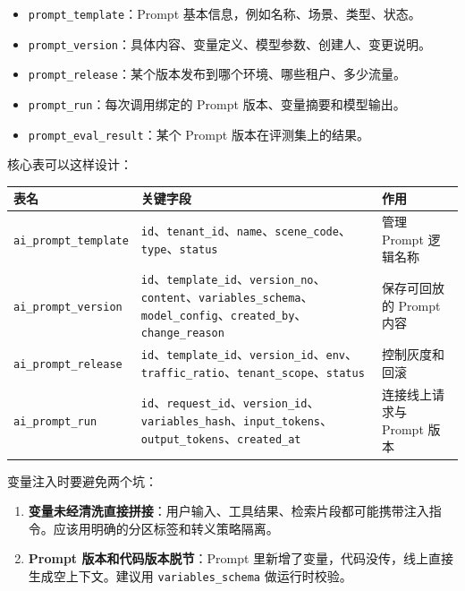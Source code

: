 \documentclass[9pt,a4paper,twocolumn]{ctexart}
\begin{document}
\begin{itemize}[itemsep=1pt, topsep=2pt]
  \item \texttt{prompt\_template}：Prompt 基本信息，例如名称、场景、类型、状态。
  \item \texttt{prompt\_version}：具体内容、变量定义、模型参数、创建人、变更说明。
  \item \texttt{prompt\_release}：某个版本发布到哪个环境、哪些租户、多少流量。
  \item \texttt{prompt\_run}：每次调用绑定的 Prompt 版本、变量摘要和模型输出。
  \item \texttt{prompt\_eval\_result}：某个 Prompt 版本在评测集上的结果。
\end{itemize}


核心表可以这样设计：


{\footnotesize
\begin{tabular}{|p{}|p{}|p{}|}
\hline
\textbf{表名} & \textbf{关键字段} & \textbf{作用} \\
\hline
\texttt{ai\_prompt\_template} & \texttt{id}、\texttt{tenant\_id}、\texttt{name}、\texttt{scene\_code}、\texttt{type}、\texttt{status} & 管理 Prompt 逻辑名称 \\
\hline
\texttt{ai\_prompt\_version} & \texttt{id}、\texttt{template\_id}、\texttt{version\_no}、\texttt{content}、\texttt{variables\_schema}、\texttt{model\_config}、\texttt{created\_by}、\texttt{change\_reason} & 保存可回放的 Prompt 内容 \\
\hline
\texttt{ai\_prompt\_release} & \texttt{id}、\texttt{template\_id}、\texttt{version\_id}、\texttt{env}、\texttt{traffic\_ratio}、\texttt{tenant\_scope}、\texttt{status} & 控制灰度和回滚 \\
\hline
\texttt{ai\_prompt\_run} & \texttt{id}、\texttt{request\_id}、\texttt{version\_id}、\texttt{variables\_hash}、\texttt{input\_tokens}、\texttt{output\_tokens}、\texttt{created\_at} & 连接线上请求与 Prompt 版本 \\
\hline
\end{tabular}
}



变量注入时要避免两个坑：


\begin{enumerate}[itemsep=1pt, topsep=2pt]
  \item \textbf{变量未经清洗直接拼接}：用户输入、工具结果、检索片段都可能携带注入指令。应该用明确的分区标签和转义策略隔离。
  \item \textbf{Prompt 版本和代码版本脱节}：Prompt 里新增了变量，代码没传，线上直接生成空上下文。建议用 \texttt{variables\_schema} 做运行时校验。
\end{enumerate}
\end{document}
